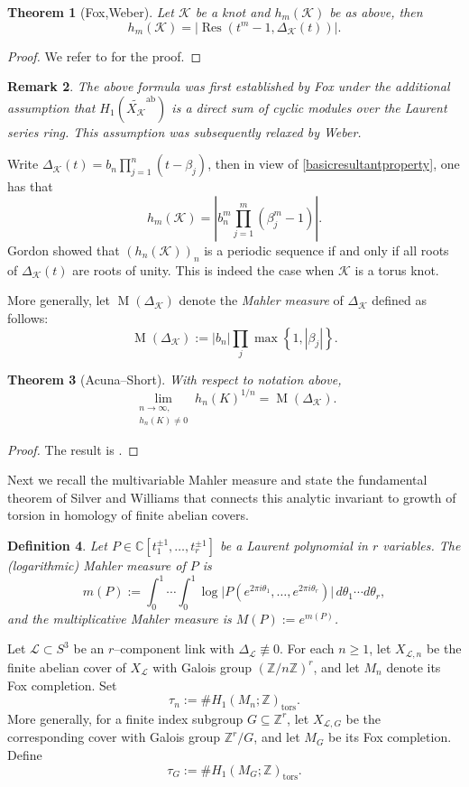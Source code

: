 \documentclass[table]{amsart}
\newtheorem{theorem}{Theorem}[section]
\newtheorem{definition}[theorem]{Definition}
\newtheorem{remark}[theorem]{Remark}
\newcommand{\cK}{\mathcal{K}}
\newcommand{\Z}{\mathbb{Z}}
\newcommand{\cL}{\mathcal{L}}
\newcommand{\op}[1]{\operatorname{#1}}
\numberwithin{equation}{section}
\begin{document}
\begin{theorem}[Fox,Weber]
    Let $\cK$ be a knot and $h_m(\cK)$ be as above, then 
    \[h_m(\cK)=|\op{Res}\left(t^m-1, \Delta_{\cK}(t)\right)|.\]
\end{theorem}
\begin{proof}
    We refer to \cite{Weber} for the proof.
\end{proof}
\begin{remark}
    The above formula was first established by Fox under the additional assumption that $H_1(\widetilde{X_{\cK}}^{\op{ab}})$ is a direct sum of cyclic modules over the Laurent series ring. This assumption was subsequently relaxed by Weber.
\end{remark}
\noindent Write $\Delta_{\cK}(t)=b_n\prod_{j=1}^n (t-\beta_j)$, then in view of \eqref{basicresultantproperty}, one has that 
\[h_m(\cK)=|b_n^m\prod_{j=1}^m (\beta_j^m-1)|.\]
\noindent Gordon \cite{Gordon} showed that $(h_n(\cK))_n$ is a periodic sequence if and only if all roots of $\Delta_{\cK}(t)$ are roots of unity. This is indeed the case when $\cK$ is a torus knot.
\par More generally, let $\op{M}(\Delta_\cK)$ denote the \emph{Mahler measure} of $\Delta_{\cK}$ defined as follows:
\[\op{M}(\Delta_\cK):=|b_n|\prod_j \op{max}\left\{1, |\beta_j|\right\}.\]
\begin{theorem}[Acuna--Short]
    With respect to notation above, 
    \[\lim_{\substack{n\rightarrow \infty,\\
    h_n(K)\neq 0}}h_n(K)^{1/n}=\op{M}(\Delta_\cK).\]
\end{theorem}
\begin{proof}
    The result is \cite[Theorem 1]{acunashort}.
\end{proof}

Next we recall the multivariable Mahler measure and state the fundamental theorem of Silver and Williams \cite{SW1, SW2} that connects this analytic invariant to growth of torsion in homology of finite abelian covers.

\begin{definition}
Let $P\in\mathbb{C}[t_1^{\pm1},\dots,t_r^{\pm1}]$ be a Laurent polynomial in $r$ variables. The (logarithmic) \emph{Mahler measure} of $P$ is
\[
m(P):=\int_{0}^1\cdots\int_0^1\log\big|P(e^{2\pi i\theta_1},\dots,e^{2\pi i\theta_r})\big|\,d\theta_1\cdots d\theta_r,
\]
and the multiplicative Mahler measure is $M(P):=e^{m(P)}$.
\end{definition}
Let $\cL\subset S^3$ be an $r$–component link with $\Delta_{\cL}\not\equiv 0$. For each $n\ge1$, let $X_{\cL,n}$ be the finite abelian cover of $X_{\cL}$ with Galois group $(\Z/n\Z)^r$, and let $M_n$ denote its Fox completion. Set
\[
\tau_n := \#H_1(M_n;\Z)_{\mathrm{tors}}.
\]
More generally, for a finite index subgroup $G\subseteq \Z^r$, let $X_{\cL,G}$ be the corresponding cover with Galois group $\Z^r/G$, and let $M_G$ be its Fox completion. Define
\[
\tau_G := \#H_1(M_G;\Z)_{\mathrm{tors}}.
\]
\end{document}
